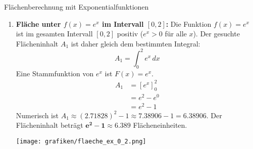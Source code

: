 \begin{loesungsumgebung}{Flächenberechnung mit Exponentialfunktionen}

\begin{enumerate}[label=(\alph*)]
    \item \textbf{Fläche unter $f(x) = e^x$ im Intervall $[0, 2]$:}
    Die Funktion $f(x)=e^x$ ist im gesamten Intervall $[0,2]$ positiv ($e^x > 0$ für alle $x$). Der gesuchte Flächeninhalt $A_1$ ist daher gleich dem bestimmten Integral:
    $$ A_1 = \int_0^2 e^x \,dx $$
    Eine Stammfunktion von $e^x$ ist $F(x) = e^x$.
    \begin{align*}
    A_1 &= [e^x]_0^2 \\
        &= e^2 - e^0 \\
        &= e^2 - 1
    \end{align*}
    Numerisch ist $A_1 \approx (2.71828)^2 - 1 \approx 7.38906 - 1 = 6.38906$.
    Der Flächeninhalt beträgt $\mathbf{e^2 - 1 \approx 6.389}$ Flächeneinheiten.
    \begin{center}
    \texttt{[image: grafiken/flaeche\_ex\_0\_2.png]}
    \label{fig:flaeche_ex_0_2}
    \end{center}


\end{enumerate}
\end{loesungsumgebung}
